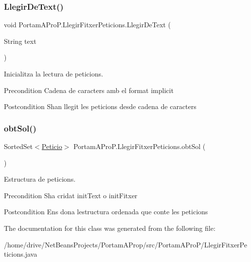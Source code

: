 \subsubsection{\texorpdfstring{Llegir\+De\+Text()}{LlegirDeText()}}
{\footnotesize\ttfamily void Portam\+A\+Pro\+P.\+Llegir\+Fitxer\+Peticions.\+Llegir\+De\+Text (\begin{DoxyParamCaption}\item[{String}]{text }\end{DoxyParamCaption})}



Inicialitza la lectura de peticions. 

\begin{DoxyPrecond}{Precondition}
Cadena de caracters amb el format implicit 
\end{DoxyPrecond}
\begin{DoxyPostcond}{Postcondition}
S\textquotesingle{}han llegit les peticions desde cadena de caracters 
\end{DoxyPostcond}
\mbox{\label{class_portam_a_pro_p_1_1_llegir_fitxer_peticions_a0009b0d3c8d0d2f9082af8a47b442e69}} 
\subsubsection{\texorpdfstring{obt\+Sol()}{obtSol()}}
{\footnotesize\ttfamily Sorted\+Set$<$\hyperlink{class_portam_a_pro_p_1_1_peticio}{Peticio}$>$ Portam\+A\+Pro\+P.\+Llegir\+Fitxer\+Peticions.\+obt\+Sol (\begin{DoxyParamCaption}{ }\end{DoxyParamCaption})}



Estructura de peticions. 

\begin{DoxyPrecond}{Precondition}
S\textquotesingle{}ha cridat init\+Text o init\+Fitxer 
\end{DoxyPrecond}
\begin{DoxyPostcond}{Postcondition}
Ens dona l\textquotesingle{}estructura ordenada que conte les peticions 
\end{DoxyPostcond}


The documentation for this class was generated from the following file\+:\begin{DoxyCompactItemize}
\item 
/home/drive/\+Net\+Beans\+Projects/\+Portam\+A\+Prop/src/\+Portam\+A\+Pro\+P/Llegir\+Fitxer\+Peticions.\+java\end{DoxyCompactItemize}

